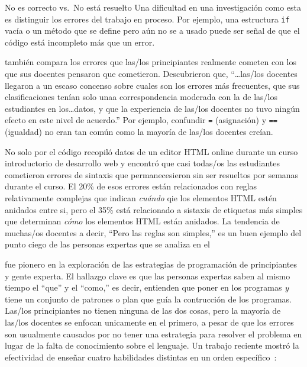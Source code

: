\begin{aside}{No es correcto vs.\ No está resuelto}
  Una dificultad en una investigación como esta es distinguir los errores del trabajo en proceso.
  Por ejemplo,
  una estructura \texttt{if} vacía o un método que se define pero aún no se a usado
  puede ser señal de que el código está incompleto más que un error.
\end{aside}

\cite{Brow2017} también compara los errores que las/los principiantes realmente cometen 
con los que sus docentes pensaron que cometieron.
Descubrieron que,
``{\ldots}las/los docentes llegaron a un escaso concenso sobre cuales son los errores más frecuentes,
que sus clasificaciones tenían solo unaa correspondencia moderada con la de las/los estudiantes en los{\ldots}datos,
y que la experiencia de las/los docentes no tuvo ningún efecto en este nivel de acuerdo.''
Por ejemplo,
confundir \texttt{=} (asignación) y \texttt{==} (igualdad)
no eran tan común como la mayoría de las/los docentes creían.

\begin{aside}{No solo por el código}
  \cite{Park2015} recopiló datos de un editor HTML online durante un curso introductorio de desarrollo web
  y encontró que casi todas/os las estudiantes cometieron errores de sintaxis que permanecesieron sin ser resueltos por semanas durante el curso.
  El 20\% de esos errores están relacionados con reglas relativamente complejas
  que indican \emph{cuándo} qie los elementos HTML estén anidados entre si,
  pero el 35\% está relacionado a sistaxis de etiquetas más simples que determinan \emph{cómo} los elementos HTML están anidados.
  La tendencia de muchas/os docentes a decir,
  ``Pero las reglas son simples,''
  es un buen ejemplo del punto ciego de las personas expertas que se analiza en el 
\end{aside}


\cite{Solo1984,Solo1986} fue pionero en la exploración de las estrategias de programación de principiantes y gente experta.
El hallazgo clave es que las personas expertas saben al mismo tiempo el ``que'' y el ``como,''
es decir, entienden que poner en los programas
\emph{y} tiene un conjunto de patrones o plan que guía la contrucción de los programas.
Las/los principiantes no tienen ninguna de las dos cosas,
pero la mayoría de las/los docentes se enfocan unicamente en el primero,
a pesar de que los errores son usualmente causados por no tener una estrategia para resolver el problema
en lugar de la falta de conocimiento sobre el lenguaje.
Un trabajo reciente mostró la efectividad de enseñar cuatro habilidades distintas en un orden específico~\cite{Xie2019}:

